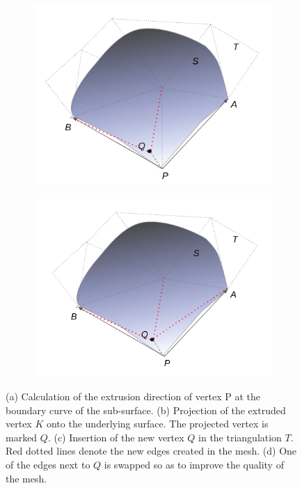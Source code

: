 \begin{figure}
\begin{subfigure}{0.5\textwidth}
	\includegraphics[width=\linewidth]{img/m1/pointInsertion.png}
	\caption{}
	\label{fig-pointPlacement3}
\end{subfigure}%
\begin{subfigure}{0.5\textwidth}
	\centering
	\includegraphics[width=\linewidth]{img/m1/localReconnection.png}
	\caption{}
	\label{fig-pointPlacement4}
\end{subfigure}
\caption{(a) Calculation of the extrusion direction of vertex P at the boundary curve of the sub-surface. (b) Projection of the extruded vertex $K$ onto the underlying surface. The projected vertex is marked $Q$. (c) Insertion of the new vertex $Q$ in the triangulation $T$. Red dotted lines denote the new edges created in the mesh. (d) One of the edges next to $Q$ is swapped so as to improve the quality of the mesh.}
\label{fig-point}
\end{figure}


